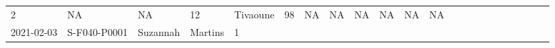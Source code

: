 \documentclass[
]{article}
\begin{document}
\begin{longtable}[]{@{}llllllllllllllllllllll@{}}
\begin{minipage}[t]{0.01\columnwidth}
2\strut
\end{minipage} & \begin{minipage}[t]{0.03\columnwidth}\raggedright
NA\strut
\end{minipage} & \begin{minipage}[t]{0.03\columnwidth}\raggedright
NA\strut
\end{minipage} & \begin{minipage}[t]{0.02\columnwidth}\raggedright
12\strut
\end{minipage} & \begin{minipage}[t]{0.03\columnwidth}\raggedright
Tivaoune\strut
\end{minipage} & \begin{minipage}[t]{0.02\columnwidth}\raggedright
98\strut
\end{minipage} & \begin{minipage}[t]{0.01\columnwidth}\raggedright
NA\strut
\end{minipage} & \begin{minipage}[t]{0.02\columnwidth}\raggedright
NA\strut
\end{minipage} & \begin{minipage}[t]{0.03\columnwidth}\raggedright
NA\strut
\end{minipage} & \begin{minipage}[t]{0.02\columnwidth}\raggedright
NA\strut
\end{minipage} & \begin{minipage}[t]{0.02\columnwidth}\raggedright
NA\strut
\end{minipage} & \begin{minipage}[t]{0.03\columnwidth}\raggedright
NA\strut
\end{minipage}\tabularnewline
\begin{minipage}[t]{0.02\columnwidth}\raggedright
2021-02-03\strut
\end{minipage} & \begin{minipage}[t]{0.02\columnwidth}\raggedright
S-F040-P0001\strut
\end{minipage} & \begin{minipage}[t]{0.02\columnwidth}\raggedright
Suzannah\strut
\end{minipage} & \begin{minipage}[t]{0.02\columnwidth}\raggedright
Martins\strut
\end{minipage} & \begin{minipage}[t]{0.01\columnwidth}\raggedright
1\strut
\end{minipage} & \begin{minipage}[t]{0.07\columnwidth}\raggedright

\end{minipage}
\end{longtable}
\end{document}
